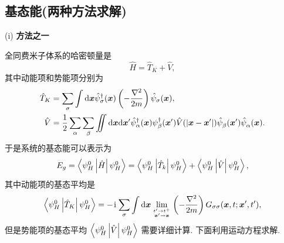 \subsection{基态能(两种方法求解)}
(i) \textbf{方法之一}

全同费米子体系的哈密顿量是
\begin{equation}
    \hat{H}=\hat{T}_{K}+\hat{V},
\end{equation}
其中动能项和势能项分别为
   \begin{align}
        \hat{T}_{K}&=\sum_{\sigma}\int\mathrm{d}\boldsymbol{x}\hat{\psi}_\sigma^\dagger(\boldsymbol{x})\left( -\frac{\nabla^2}{2m} \right) \hat{\psi}_\sigma(\boldsymbol{x}),\\
        \hat{V}&=\frac{1}{2}\sum_\alpha\sum_\beta\iint\mathrm{d}\boldsymbol{x}\mathrm{d}\boldsymbol{x}'\hat{\psi}_\alpha^\dagger(\boldsymbol{x})\psi_\beta^\dagger(\boldsymbol{x}')\hat{V}(|\boldsymbol{x}-\boldsymbol{x}'|)\hat{\psi}_{\beta}^{ }(\boldsymbol{x}')\hat{\psi}_\alpha^{ }(\boldsymbol{x}).
    \end{align}
于是系统的基态能可以表示为
\begin{equation}
    E_g=\left\langle \psi_H^0\left|\hat{H}\right|\psi_H^0 \right\rangle=\left\langle \psi_H^0\left|\hat{T}_k\right|\psi_H^0 \right\rangle+\left\langle\psi_H^0\left| \hat{V} \right| \psi_H^0 \right\rangle,
\end{equation}
其中动能项的基态平均是
\begin{equation}
    \left\langle \psi_H^0 \left| \hat{T}_{K} \right| \psi_H^0\right\rangle=-\hspace{0.1em}\mathrm{i}\hspace{0.1em}\sum_\sigma\int\mathrm{d}\boldsymbol{x}\lim_{t'\to t^+\atop\boldsymbol{x}'\to \boldsymbol{x}}\left( -\frac{\nabla^2}{2m} \right) G_{\sigma\sigma}(\boldsymbol{x},t;\boldsymbol{x}',t'),
\end{equation}
但是势能项的基态平均 $\left\langle \psi_H^0 \left| \hat{V} \right|\psi_H^0\right\rangle$ 需要详细计算. 下面利用运动方程求解.

